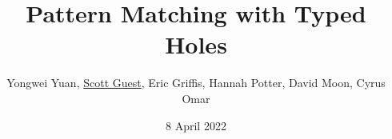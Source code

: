\documentclass{beamer}
\title[Computer Science Honors Thesis]{Pattern Matching with Typed Holes}
\author{Yongwei Yuan, \underline{Scott Guest}, Eric Griffis, Hannah Potter, David Moon, Cyrus Omar}
\institute{University of Michigan}
\date{8 April 2022}
\newcommand{\li}[1]{\lstinline[basicstyle=\ttfamily\fontsize{9pt}{1em}\selectfont]{#1}}
\begin{document}
\begin{frame}
\titlepage
\end{frame}


\end{document}
